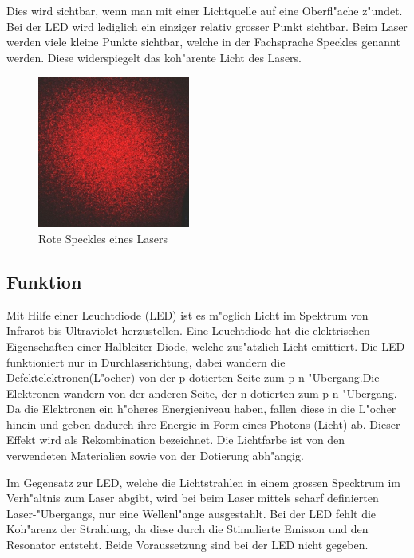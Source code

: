 \begin{refsection}
Dies wird sichtbar, wenn man mit einer Lichtquelle auf eine Oberfl"ache 
z"undet. Bei der LED wird lediglich ein einziger relativ grosser Punkt 
sichtbar. Beim Laser werden viele kleine Punkte sichtbar, welche in der
Fachsprache Speckles genannt werden. Diese widerspiegelt das koh"arente Licht
des Lasers.

\begin{figure}
\centering
\includegraphics[width = 5cm]{laser/bilder/Objective_speckle.jpg}
\caption{Rote Speckles eines Lasers \cite{WikiSpeckle}}
\end{figure}

\subsection{Funktion}
Mit Hilfe einer Leuchtdiode (LED) ist es m"oglich Licht im Spektrum von 
Infrarot bis Ultraviolet herzustellen. Eine Leuchtdiode hat die elektrischen 
Eigenschaften einer Halbleiter-Diode, welche zus"atzlich Licht emittiert. Die 
LED funktioniert nur in Durchlassrichtung, dabei wandern die 
Defektelektronen(L"ocher) von der p-dotierten Seite zum p-n-"Ubergang.Die 
Elektronen wandern von der anderen Seite, der n-dotierten zum p-n-"Ubergang. 
Da die Elektronen ein h"oheres Energieniveau haben, fallen diese in die 
L"ocher hinein und geben dadurch ihre Energie in Form eines Photons (Licht) 
ab. Dieser Effekt wird als Rekombination bezeichnet. Die Lichtfarbe ist von 
den verwendeten Materialien sowie von der Dotierung abh"angig.

Im Gegensatz zur LED, welche die Lichtstrahlen in einem grossen Specktrum im 
Verh"altnis zum Laser abgibt, wird bei beim Laser mittels scharf definierten 
Laser-"Ubergangs, nur eine Wellenl"ange ausgestahlt.  
Bei der LED fehlt die Koh"arenz der Strahlung, da 
diese durch die Stimulierte Emisson und den Resonator entsteht. Beide 
Voraussetzung sind bei der LED nicht gegeben. 


\end{refsection}
